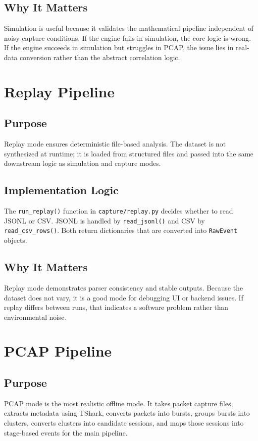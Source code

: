 \documentclass[12pt,a4paper]{report}
\begin{document}
\section{Why It Matters}
Simulation is useful because it validates the mathematical pipeline independent of noisy capture conditions. If the engine fails in simulation, the core logic is wrong. If the engine succeeds in simulation but struggles in PCAP, the issue lies in real-data conversion rather than the abstract correlation logic.

\chapter{Replay Pipeline}
\section{Purpose}
Replay mode ensures deterministic file-based analysis. The dataset is not synthesized at runtime; it is loaded from structured files and passed into the same downstream logic as simulation and capture modes.

\section{Implementation Logic}
The \texttt{run\_replay()} function in \texttt{capture/replay.py} decides whether to read JSONL or CSV. JSONL is handled by \texttt{read\_jsonl()} and CSV by \texttt{read\_csv\_rows()}. Both return dictionaries that are converted into \texttt{RawEvent} objects.

\section{Why It Matters}
Replay mode demonstrates parser consistency and stable outputs. Because the dataset does not vary, it is a good mode for debugging UI or backend issues. If replay differs between runs, that indicates a software problem rather than environmental noise.

\chapter{PCAP Pipeline}
\section{Purpose}
PCAP mode is the most realistic offline mode. It takes packet capture files, extracts metadata using TShark, converts packets into bursts, groups bursts into clusters, converts clusters into candidate sessions, and maps those sessions into stage-based events for the main pipeline.
\end{document}
